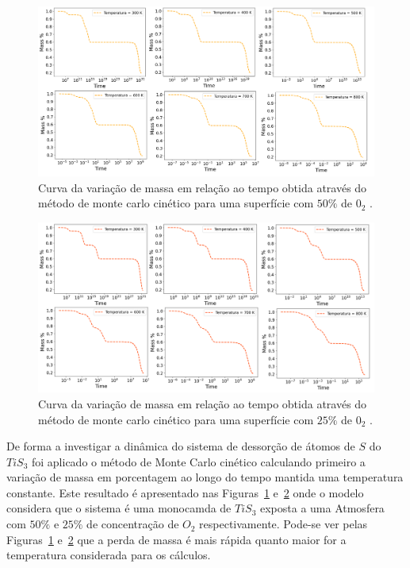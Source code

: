 \documentclass[12pt]{elsarticle}
\begin{document}
\begin{figure}[!htbp]
\centering\includegraphics[scale=0.8]{figures/var-massa-tempo-2.png}
\caption{Curva da variação de massa em relação ao tempo obtida através do método de monte carlo cinético para uma superfície com $50\%$ de $0_2$ . }
\label{f2}
\end{figure}

\begin{figure}[!htbp]
\centering\includegraphics[scale=0.8]{figures/var-massa-tempo-25.png}
\caption{Curva da variação de massa em relação ao tempo obtida através do método de monte carlo cinético para uma superfície com $25\%$ de $0_2$ . }

\label{f3}
\end{figure}

De forma a investigar a dinâmica do sistema de dessorção de átomos de $S$ do $TiS_3$ foi aplicado o método de Monte Carlo cinético calculando primeiro a variação de massa em porcentagem ao longo do tempo mantida uma temperatura constante. Este resultado é apresentado nas Figuras~\ref{f2} e~\ref{f3} onde o modelo considera que o sistema é uma monocamda de $TiS_3$ exposta a uma Atmosfera com $50\%$ e $25\%$ de concentração de $O_2$ respectivamente. Pode-se ver pelas Figuras~\ref{f2} e~\ref{f3} que a perda de massa é mais rápida quanto maior for a temperatura considerada para os cálculos. 
\end{document}

